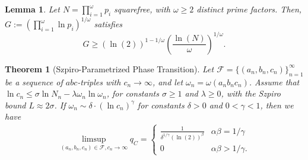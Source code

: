 \documentclass[10pt,a4paper]{amsart}
\newtheorem{theorem}{Theorem}
\newtheorem{lemma}{Lemma}
\def\ra{\rightarrow}
\begin{document}
\begin{lemma}
\label{sqfree-lemma}
Let $N = \prod_{i=1}^\omega p_i$ squarefree, with $\omega \ge 2$ distinct prime factors. Then, $G := \left(\prod_{i=1}^\omega \ln p_i\right)^{1/\omega}$ satisfies
\[
    G \ge (\ln (2))^{1-1/\omega} \left( \frac{\ln (N)}{\omega} \right)^{1/\omega}.
\]
\end{lemma}

\begin{theorem}[Szpiro-Parametrized Phase Transition]
\label{T-szpiro}
Let $\mathcal{F} = \{(a_n, b_n, c_n)\}_{n=1}^{\infty}$ be a sequence of $abc$-triples with $c_n \to \infty$, and let $\omega_n = \omega(a_n b_n c_n)$. Assume that $\ln c_n \le \sigma \ln N_n - \lambda \omega_n \ln \omega_n$, for constants $\sigma \ge 1$ and $\lambda \ge 0$, with the Szpiro bound $L \approx 2\sigma$. If $\omega_n \sim \delta \cdot (\ln c_n)^\gamma$ for constants $\delta > 0$ and $0 < \gamma < 1$, then we have
\begin{align*}
    \limsup_{(a_n, b_n, c_n) \in \mathcal{F}, c_n \ra \infty} q_C = \begin{cases}
        \frac{1}{\delta^{1/\gamma} (\ln(2))^{\beta}} & \alpha \beta = 1/\gamma \\
        0 & \alpha \beta > 1/\gamma.
    \end{cases}
\end{align*}

\end{theorem}
\end{document}
